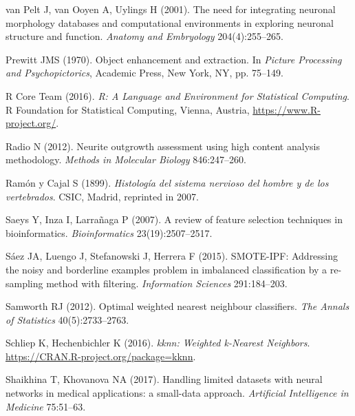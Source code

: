 \begin{thebibliography}{110}
van Pelt J, van Ooyen A, Uylings H (2001). The need for integrating neuronal
  morphology databases and computational environments in exploring neuronal
  structure and function. \emph{Anatomy and Embryology} 204(4):255--265.

Prewitt JMS (1970).
\newblock Object enhancement and extraction. In \emph{Picture Processing and
  Psychopictorics}, Academic Press, New York, NY, pp. 75--149.

{R Core Team} (2016).
\newblock \emph{R: A Language and Environment for Statistical Computing}. R
  Foundation for Statistical Computing, Vienna, Austria,
  \urlprefix\url{https://www.R-project.org/}.

Radio N (2012). Neurite outgrowth assessment using high content analysis
  methodology. \emph{Methods in Molecular Biology} 846:247--260.

{Ram\'on y Cajal} S (1899). \emph{Histolog\'ia del sistema nervioso del hombre
  y de los vertebrados}. CSIC, Madrid, reprinted in 2007.

Saeys Y, Inza I, Larra\~naga P (2007). A review of feature selection techniques
  in bioinformatics. \emph{Bioinformatics} 23(19):2507--2517.

{\color{red}S{\'a}ez JA, Luengo J, Stefanowski J, Herrera F (2015). {SMOTE-IPF}: Addressing
  the noisy and borderline examples problem in imbalanced classification by a
  re-sampling method with filtering. \emph{Information Sciences} 291:184--203.}

Samworth RJ (2012). {Optimal weighted nearest neighbour classifiers}. \emph{The
  Annals of Statistics} 40(5):2733--2763.

Schliep K, Hechenbichler K (2016).
\newblock \emph{kknn: Weighted k-Nearest Neighbors}.
  \urlprefix\url{https://CRAN.R-project.org/package=kknn}.

Shaikhina T, Khovanova NA (2017). Handling limited datasets with neural
  networks in medical applications: a small-data approach. \emph{Artificial
  Intelligence in Medicine} 75:51--63.


\end{thebibliography}
